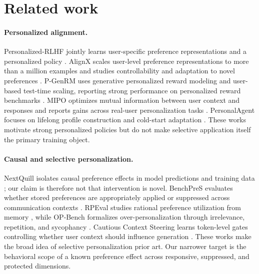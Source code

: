 \section{Related work}
\paragraph{Personalized alignment.}
Personalized-RLHF jointly learns user-specific preference representations and a personalized policy \citep{prlhf}. AlignX scales user-level preference representations to more than a million examples and studies controllability and adaptation to novel preferences \citep{alignx}. P-GenRM uses generative personalized reward modeling and user-based test-time scaling, reporting strong performance on personalized reward benchmarks \citep{pgenrm}. MIPO optimizes mutual information between user context and responses and reports gains across real-user personalization tasks \citep{mipo}. PersonalAgent focuses on lifelong profile construction and cold-start adaptation \citep{personalagent}. These works motivate strong personalized policies but do not make selective application itself the primary training object.

\paragraph{Causal and selective personalization.}
NextQuill isolates causal preference effects in model predictions and training data \citep{nextquill}; our claim is therefore not that intervention is novel. BenchPreS evaluates whether stored preferences are appropriately applied or suppressed across communication contexts \citep{benchpres}. RPEval studies rational preference utilization from memory \citep{rpeval}, while OP-Bench formalizes over-personalization through irrelevance, repetition, and sycophancy \citep{opbench}. Cautious Context Steering learns token-level gates controlling whether user context should influence generation \citep{ccs}. These works make the broad idea of selective personalization prior art. Our narrower target is the behavioral scope of a known preference effect across responsive, suppressed, and protected dimensions.

